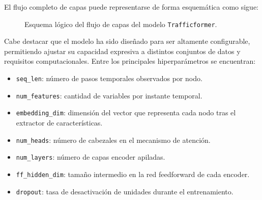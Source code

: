 El flujo completo de capas puede representarse de forma esquemática como sigue:

\begin{figure}[H]
	\centering
	\caption{Esquema lógico del flujo de capas del modelo \texttt{Trafficformer}.}
	\label{fig:trafficformer_vertical}
\end{figure}

Cabe destacar que el modelo ha sido diseñado para ser altamente configurable, permitiendo ajustar su capacidad expresiva a distintos conjuntos de datos y requisitos computacionales. Entre los principales hiperparámetros se encuentran:

\begin{itemize}
	\item \texttt{seq\_len}: número de pasos temporales observados por nodo.
	\item \texttt{num\_features}: cantidad de variables por instante temporal.
	\item \texttt{embedding\_dim}: dimensión del vector que representa cada nodo tras el extractor de características.
	\item \texttt{num\_heads}: número de cabezales en el mecanismo de atención.
	\item \texttt{num\_layers}: número de capas encoder apiladas.
	\item \texttt{ff\_hidden\_dim}: tamaño intermedio en la red feedforward de cada encoder.
	\item \texttt{dropout}: tasa de desactivación de unidades durante el entrenamiento.
\end{itemize}

